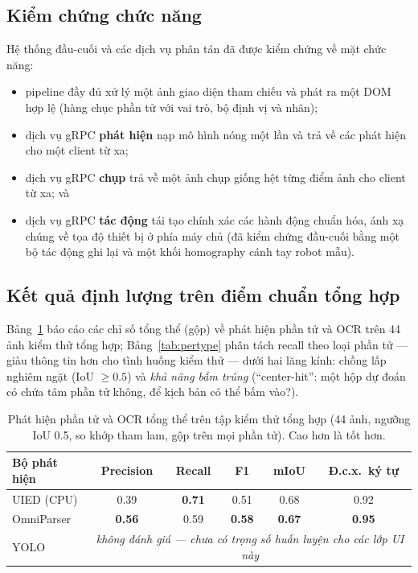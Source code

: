 \documentclass[11pt,a4paper]{article}
\begin{document}
\subsection{Kiểm chứng chức năng}
Hệ thống đầu-cuối và các dịch vụ phân tán đã được kiểm chứng về mặt chức năng:
\begin{itemize}[leftmargin=1.4em]
  \item pipeline đầy đủ xử lý một ảnh giao diện tham chiếu và phát ra một DOM hợp lệ
        (hàng chục phần tử với vai trò, bộ định vị và nhãn);
  \item dịch vụ gRPC \textbf{phát hiện} nạp mô hình nóng một lần và trả về các phát
        hiện cho một client từ xa;
  \item dịch vụ gRPC \textbf{chụp} trả về một ảnh chụp giống hệt từng điểm ảnh cho
        client từ xa; và
  \item dịch vụ gRPC \textbf{tác động} tái tạo chính xác các hành động chuẩn hóa,
        ánh xạ chúng về tọa độ thiết bị ở phía máy chủ (đã kiểm chứng đầu-cuối bằng
        một bộ tác động ghi lại và một khối homography cánh tay robot mẫu).
\end{itemize}

\subsection{Kết quả định lượng trên điểm chuẩn tổng hợp}
Bảng~\ref{tab:results} báo cáo các chỉ số tổng thể (gộp) về phát hiện phần tử và OCR
trên 44 ảnh kiểm thử tổng hợp; Bảng~\ref{tab:pertype} phân tách recall theo loại phần
tử --- giàu thông tin hơn cho tình huống kiểm thử --- dưới hai lăng kính: chồng lấp
nghiêm ngặt (IoU $\geq 0.5$) và \emph{khả năng bấm trúng} (``center-hit'': một hộp dự
đoán có chứa tâm phần tử không, để kịch bản có thể bấm vào?).

\begin{table}[H]
  \centering
  \caption{Phát hiện phần tử và OCR tổng thể trên tập kiểm thử tổng hợp (44 ảnh,
  ngưỡng IoU 0.5, so khớp tham lam, gộp trên mọi phần tử). Cao hơn là tốt hơn.}
  \label{tab:results}
  \begin{tabular}{lccccc}
    \toprule
    Bộ phát hiện & Precision & Recall & F1 & mIoU & Đ.c.x.\ ký tự \\
    \midrule
    UIED (CPU)   & 0.39 & \textbf{0.71} & 0.51 & 0.68 & 0.92 \\
    OmniParser   & \textbf{0.56} & 0.59 & \textbf{0.58} & \textbf{0.67} & \textbf{0.95} \\
    YOLO         & \multicolumn{5}{c}{\emph{không đánh giá --- chưa có trọng số huấn luyện cho các lớp UI này}} \\
    \bottomrule
  \end{tabular}
\end{table}
\end{document}
